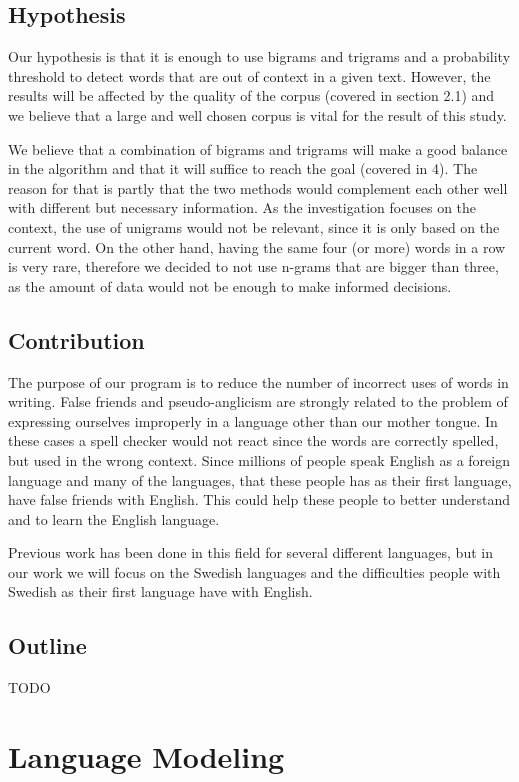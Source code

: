 \documentclass[a4paper,12pt]{article}
\begin{document}
\subsection{Hypothesis}
Our hypothesis is that it is enough to use bigrams and trigrams and a probability threshold to detect words that are out of context in a given text. However, the results will be affected by the quality of the corpus (covered in section 2.1) and we believe that a large and well chosen corpus is vital for the result of this study.

We believe that a combination of bigrams and trigrams will make a good balance in the algorithm and that it will suffice to reach the goal (covered in 4). The reason for that is partly that the two methods would complement each other well with different but necessary information. As the investigation focuses on the context, the use of unigrams would not be relevant, since it is only based on the current word. On the other hand, having the same four (or more) words in a row is very rare, therefore we decided to not use n-grams that are bigger than three, as the amount of data would not be enough to make informed decisions.

\subsection{Contribution}
\label{sec:contribution}
The purpose of our program is to reduce the number of incorrect uses of  words in writing. False friends and pseudo-anglicism are strongly related to the problem of expressing ourselves improperly in a language other than our mother tongue. In these cases a spell checker would not react since the words are correctly spelled, but used in the wrong context. Since millions of people speak English as a foreign language and many of the languages, that these people has as their first language, have false friends with English. This could help these people to better understand and to learn the English language. 

Previous work has been done in this field for several different languages, but in our work we will focus on the Swedish languages and the difficulties people with Swedish as their first language have with English.

\subsection{Outline}
\label{sec:outline}
TODO

\section{Language Modeling}
\end{document}
